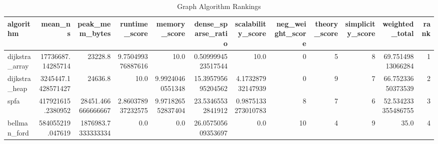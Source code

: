 \begin{table}[htbp]
\centering
\caption{Graph Algorithm Rankings}
\label{tab:scores_graph}
\begin{tabular}{lrrrrrrrrrrr}
\hline
algorithm & mean_ns & peak_mem_bytes & runtime_score & memory_score & dense_sparse_ratio & scalability_score & neg_weight_score & theory_score & simplicity_score & weighted_total & rank \\
\hline
dijkstra_array & 17736687.14285714 & 23228.8 & 9.750499376887616 & 10.0 & 0.5099994523517544 & 10.0 & 0 & 5 & 8 & 69.75149813066284 & 1 \\
dijkstra_heap & 3245447.1428571427 & 24636.8 & 10.0 & 9.99240460551348 & 15.395795695204562 & 4.173287932147939 & 0 & 9 & 7 & 66.75233650373539 & 2 \\
spfa & 417921615.2380952 & 28451.466666666667 & 2.860378937232575 & 9.971826552837404 & 23.53465532841912 & 0.9875133273010783 & 8 & 7 & 6 & 52.534233355486755 & 3 \\
bellman_ford & 584055219.047619 & 1876983.7333333334 & 0.0 & 0.0 & 26.057505609353697 & 0.0 & 10 & 4 & 9 & 35.0 & 4 \\
\hline
\end{tabular}
\end{table}
